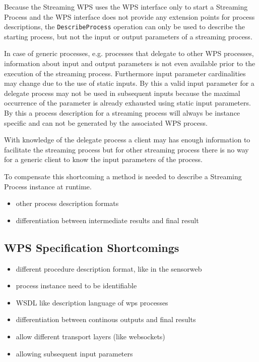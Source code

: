		Because the Streaming \ac{WPS} uses the \ac{WPS} interface only to start a Streaming Process and the \ac{WPS} interface does not provide any extension points for process descriptions, the \texttt{DescribeProcess} operation can only be used to describe the starting process, but not the input or output parameters of a streaming process.

		In case of generic processes, e.g. processes that delegate to other \ac{WPS} processes, information about input and output parameters is not even available prior to the execution of the streaming process. Furthermore input parameter cardinalities may change due to the use of static inputs. By this a valid input parameter for a delegate process may not be used in subsequent inputs because the maximal occurrence of the parameter is already exhausted using static input parameters. By this a process description for a streaming process will always be instance specific and can not be generated by the associated \ac{WPS} process.

		With knowledge of the delegate process a client may has enough information to facilitate the streaming process but for other streaming process there is no way for a generic client to know the input parameters of the process.

		To compensate this shortcoming a method is needed to describe a Streaming Process instance at runtime.
		\begin{itemize}
			\item other process description formats
			\item differentiation between intermediate results and final result
		\end{itemize}
	\subsection{WPS Specification Shortcomings}
	\begin{itemize}
		\item different procedure description format, like in the sensorweb
		\item process instance need to be identifiable
		\item WSDL like description language of wps processes
		\item differentiation between continous outputs and final results
		\item allow different transport layers (like websockets)
		\item allowing subsequent input parameters
	\end{itemize}

